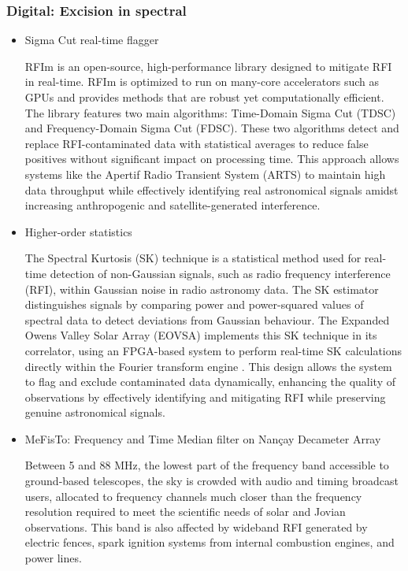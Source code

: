 \subsubsection{Digital: Excision in spectral}
\begin{itemize}
\item Sigma Cut real-time flagger

 RFIm \cite{sclocco2019real} is an open-source, high-performance library designed to mitigate RFI in real-time. RFIm is optimized to run on many-core accelerators such as GPUs and provides methods that are robust yet computationally efficient. The library features two main algorithms: Time-Domain Sigma Cut (TDSC) and Frequency-Domain Sigma Cut (FDSC). These two algorithms detect and replace RFI-contaminated data with statistical averages to reduce false positives without significant impact on processing time. This approach allows systems like the Apertif Radio Transient System (ARTS) to maintain high data throughput while effectively identifying real astronomical signals amidst increasing anthropogenic and satellite-generated interference.
 
\item Higher-order statistics

The Spectral Kurtosis (SK) technique is a statistical method used for real-time detection of non-Gaussian signals, such as radio frequency interference (RFI), within Gaussian noise in radio astronomy data. The SK estimator distinguishes signals by comparing power and power-squared values of spectral data to detect deviations from Gaussian behaviour. The Expanded Owens Valley Solar Array (EOVSA) implements this SK technique in its correlator, using an FPGA-based system to perform real-time SK calculations directly within the Fourier transform engine \cite{}. This design allows the system to flag and exclude contaminated data dynamically, enhancing the quality of observations by effectively identifying and mitigating RFI while preserving genuine astronomical signals.

\item MeFisTo: Frequency and Time Median filter on Nançay Decameter Array

Between 5 and 88 MHz, the lowest part of the frequency band accessible to ground-based telescopes, the sky is crowded with audio and timing broadcast users, allocated to frequency channels much closer than the frequency resolution required to meet the scientific needs of solar and Jovian observations. This band is also affected by wideband RFI generated by electric fences, spark ignition systems from internal combustion engines, and power lines.


\end{itemize}
